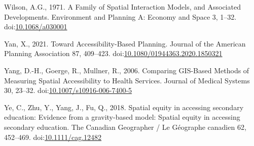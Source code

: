\documentclass[]{elsarticle} %
\newlength{\cslhangindent}
\newlength{\cslentryspacingunit} %
\newenvironment{CSLReferences}[2] %
 {%
  \setlength{\parindent}{0pt}
  \ifodd #1
  \let\oldpar\par
  \def\par{\hangindent=\cslhangindent\oldpar}
  \fi
  \setlength{\parskip}{#2\cslentryspacingunit}
 }%
 {}
\begin{document}
\begin{CSLReferences}{1}{0}
\leavevmode{}%
Wilson, A.G., 1971. A Family of Spatial Interaction Models, and
Associated Developments. Environment and Planning A: Economy and Space
3, 1--32. doi:\href{https://doi.org/10.1068/a030001}{10.1068/a030001}

\leavevmode{}%
Yan, X., 2021. Toward Accessibility-Based Planning. Journal of the
American Planning Association 87, 409--423.
doi:\href{https://doi.org/10.1080/01944363.2020.1850321}{10.1080/01944363.2020.1850321}

\leavevmode{}%
Yang, D.-H., Goerge, R., Mullner, R., 2006. Comparing {GIS}-{Based}
{Methods} of {Measuring} {Spatial} {Accessibility} to {Health}
{Services}. Journal of Medical Systems 30, 23--32.
doi:\href{https://doi.org/10.1007/s10916-006-7400-5}{10.1007/s10916-006-7400-5}

\leavevmode{}%
Ye, C., Zhu, Y., Yang, J., Fu, Q., 2018. Spatial equity in accessing
secondary education: {Evidence} from a gravity-based model: {Spatial}
equity in accessing secondary education. The Canadian Geographer / Le
Géographe canadien 62, 452--469.
doi:\href{https://doi.org/10.1111/cag.12482}{10.1111/cag.12482}

\end{CSLReferences}
\end{document}
